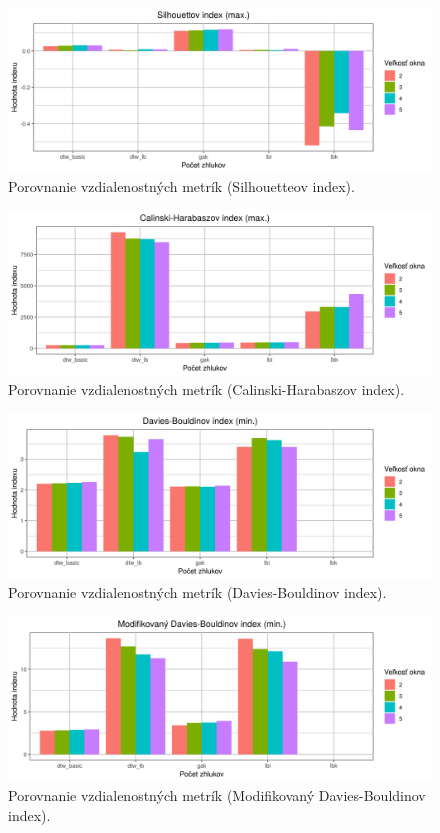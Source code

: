 \documentclass[a4paper,twoside,slovak,12pt,appendix]{article}
\begin{document}
\begin{appendices}
\begin{figure}[htbp]
  \centering
  \includegraphics[width=\textwidth]{cvi/metric_comparison/201904291105-Sil-metric_comparison.png}
  \caption{Porovnanie vzdialenostných metrík (Silhouetteov index).}
\end{figure}
\begin{figure}[htbp]
  \centering
  \includegraphics[width=\textwidth]{cvi/metric_comparison/201904291105-CH-metric_comparison.png}
  \caption{Porovnanie vzdialenostných metrík (Calinski-Harabaszov index).}
\end{figure}
\begin{figure}[htbp]
  \centering
  \includegraphics[width=\textwidth]{cvi/metric_comparison/201904291105-DB-metric_comparison.png}
  \caption{Porovnanie vzdialenostných metrík (Davies-Bouldinov index).}
\end{figure}
\begin{figure}[htbp]
  \centering
  \includegraphics[width=\textwidth]{cvi/metric_comparison/201904291105-DBstar-metric_comparison.png}
  \caption{Porovnanie vzdialenostných metrík (Modifikovaný Davies-Bouldinov index).}
\end{figure}


\end{appendices}
\end{document}
